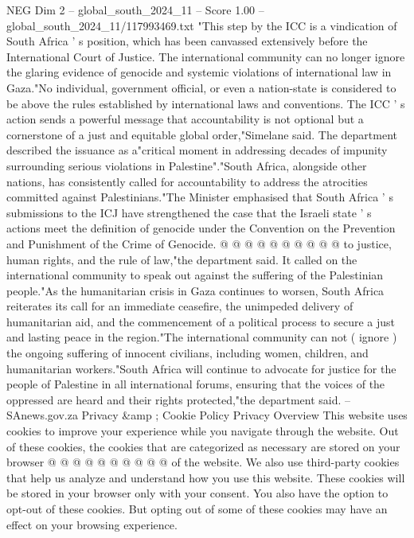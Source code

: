 \begin{textsample}{NEG Dim 2 – global\_south\_2024\_11 – Score 1.00 – global\_south\_2024\_11/117993469.txt}  \label{ex:f2_neg_265}
"This step by the ICC is a vindication of South Africa ' s position, which has been canvassed extensively before the International Court of Justice.
The international community can no longer ignore the glaring evidence of genocide and systemic violations of international law in Gaza."No individual, government official, or even a nation-state is considered to be above the rules established by international laws and conventions.
The ICC ' s action sends a powerful message that accountability is not optional but a cornerstone of a just and equitable global order,"Simelane said.
The department described the issuance as a"critical moment in addressing decades of impunity surrounding serious violations in Palestine"."South Africa, alongside other nations, has consistently called for accountability to address the atrocities committed against Palestinians."The Minister emphasised that South Africa ' s submissions to the ICJ have strengthened the case that the Israeli state ' s actions meet the definition of genocide under the Convention on the Prevention and Punishment of the Crime of Genocide. @ @ @ @ @ @ @ @ @ @ to justice, human rights, and the rule of law,"the department said.
It called on the international community to speak out against the suffering of the Palestinian people."As the humanitarian crisis in Gaza continues to worsen, South Africa reiterates its call for an immediate ceasefire, the unimpeded delivery of humanitarian aid, and the commencement of a political process to secure a just and lasting peace in the region."The international community can not ( ignore ) the ongoing suffering of innocent civilians, including women, children, and humanitarian workers."South Africa will continue to advocate for justice for the people of Palestine in all international forums, ensuring that the voices of the oppressed are heard and their rights protected,"the department said. -- SAnews.gov.za Privacy \&amp ; Cookie Policy Privacy Overview This website uses cookies to improve your experience while you navigate through the website.
Out of these cookies, the cookies that are categorized as necessary are stored on your browser @ @ @ @ @ @ @ @ @ @ of the website.
We also use third-party cookies that help us analyze and understand how you use this website.
These cookies will be stored in your browser only with your consent.
You also have the option to opt-out of these cookies.
But opting out of some of these cookies may have an effect on your browsing experience.

\end{textsample}
